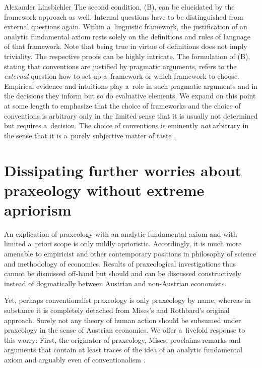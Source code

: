 \begin{artengenv}{Alexander Linsbichler}
The second condition, (B), can be elucidated by the framework approach as well. Internal questions have to be distinguished from external questions again. Within a~linguistic framework, the justification of an analytic fundamental axiom rests solely on the definitions and rules of language of that framework. Note that being true in virtue of definitions does not imply triviality. The respective proofs can be highly intricate. The formulation of (B), stating that conventions are justified by pragmatic arguments, refers to the \textit{external} question how to set up a~framework or which framework to choose. Empirical evidence and intuitions play a~role in such pragmatic arguments and in the decisions they inform but so do evaluative elements. We expand on this point at some length to emphasize that the choice of frameworks and the choice of conventions is arbitrary only in the limited sense that it is usually not determined but requires a~decision. The choice of conventions is eminently \textit{not} arbitrary in the sense that it is a~purely subjective matter of taste 
\parencites[see also][p.3379]{linsbichler_austrian_2021}[][]{dambock_factvalue_2024}.%




\section{Dissipating further worries about praxeology without extreme apriorism}

An explication of praxeology with an analytic fundamental axiom and with limited a~priori scope is only mildly aprioristic. Accordingly, it is much more amenable to empiricist and other contemporary positions in philosophy of science and methodology of economics. Results of praxeological investigations thus cannot be dismissed off-hand but should and can be discussed constructively instead of dogmatically between Austrian and non-Austrian economists.



Yet, perhaps conventionalist praxeology is only praxeology by name, whereas in substance it is completely detached from Mises's and Rothbard's original approach. Surely not any theory of human action should be subsumed under praxeology in the sense of Austrian economics. We offer a~fivefold response to this worry: First, the originator of praxeology, Mises, proclaims remarks and arguments that contain at least traces of the idea of an analytic fundamental axiom and arguably even of conventionalism 
\parencite[][pp.3376–3378]{linsbichler_austrian_2021}.%





\end{artengenv}
